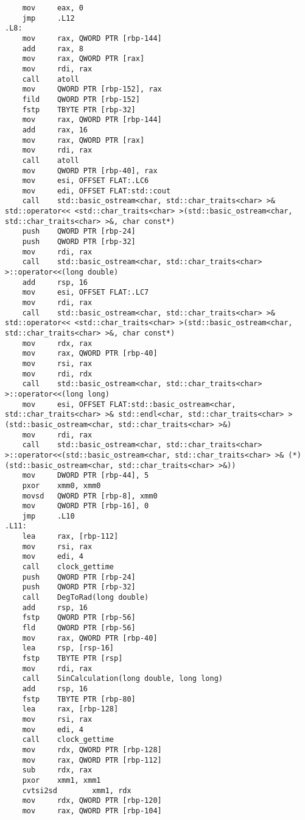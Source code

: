 \documentclass[12pt,a4paper]{article}
\numberwithin{subsection}{section}
\begin{document}
\begin{lstlisting}
    mov     eax, 0
    jmp     .L12
.L8:
    mov     rax, QWORD PTR [rbp-144]
    add     rax, 8
    mov     rax, QWORD PTR [rax]
    mov     rdi, rax
    call    atoll
    mov     QWORD PTR [rbp-152], rax
    fild    QWORD PTR [rbp-152]
    fstp    TBYTE PTR [rbp-32]
    mov     rax, QWORD PTR [rbp-144]
    add     rax, 16
    mov     rax, QWORD PTR [rax]
    mov     rdi, rax
    call    atoll
    mov     QWORD PTR [rbp-40], rax
    mov     esi, OFFSET FLAT:.LC6
    mov     edi, OFFSET FLAT:std::cout
    call    std::basic_ostream<char, std::char_traits<char> >& std::operator<< <std::char_traits<char> >(std::basic_ostream<char, std::char_traits<char> >&, char const*)
    push    QWORD PTR [rbp-24]
    push    QWORD PTR [rbp-32]
    mov     rdi, rax
    call    std::basic_ostream<char, std::char_traits<char> >::operator<<(long double)
    add     rsp, 16
    mov     esi, OFFSET FLAT:.LC7
    mov     rdi, rax
    call    std::basic_ostream<char, std::char_traits<char> >& std::operator<< <std::char_traits<char> >(std::basic_ostream<char, std::char_traits<char> >&, char const*)
    mov     rdx, rax
    mov     rax, QWORD PTR [rbp-40]
    mov     rsi, rax
    mov     rdi, rdx
    call    std::basic_ostream<char, std::char_traits<char> >::operator<<(long long)
    mov     esi, OFFSET FLAT:std::basic_ostream<char, std::char_traits<char> >& std::endl<char, std::char_traits<char> >(std::basic_ostream<char, std::char_traits<char> >&)
    mov     rdi, rax
    call    std::basic_ostream<char, std::char_traits<char> >::operator<<(std::basic_ostream<char, std::char_traits<char> >& (*)(std::basic_ostream<char, std::char_traits<char> >&))
    mov     DWORD PTR [rbp-44], 5
    pxor    xmm0, xmm0
    movsd   QWORD PTR [rbp-8], xmm0
    mov     QWORD PTR [rbp-16], 0
    jmp     .L10
.L11:
    lea     rax, [rbp-112]
    mov     rsi, rax
    mov     edi, 4
    call    clock_gettime
    push    QWORD PTR [rbp-24]
    push    QWORD PTR [rbp-32]
    call    DegToRad(long double)
    add     rsp, 16
    fstp    QWORD PTR [rbp-56]
    fld     QWORD PTR [rbp-56]
    mov     rax, QWORD PTR [rbp-40]
    lea     rsp, [rsp-16]
    fstp    TBYTE PTR [rsp]
    mov     rdi, rax
    call    SinCalculation(long double, long long)
    add     rsp, 16
    fstp    TBYTE PTR [rbp-80]
    lea     rax, [rbp-128]
    mov     rsi, rax
    mov     edi, 4
    call    clock_gettime
    mov     rdx, QWORD PTR [rbp-128]
    mov     rax, QWORD PTR [rbp-112]
    sub     rdx, rax
    pxor    xmm1, xmm1
    cvtsi2sd        xmm1, rdx
    mov     rdx, QWORD PTR [rbp-120]
    mov     rax, QWORD PTR [rbp-104]

\end{lstlisting}
\end{document}
